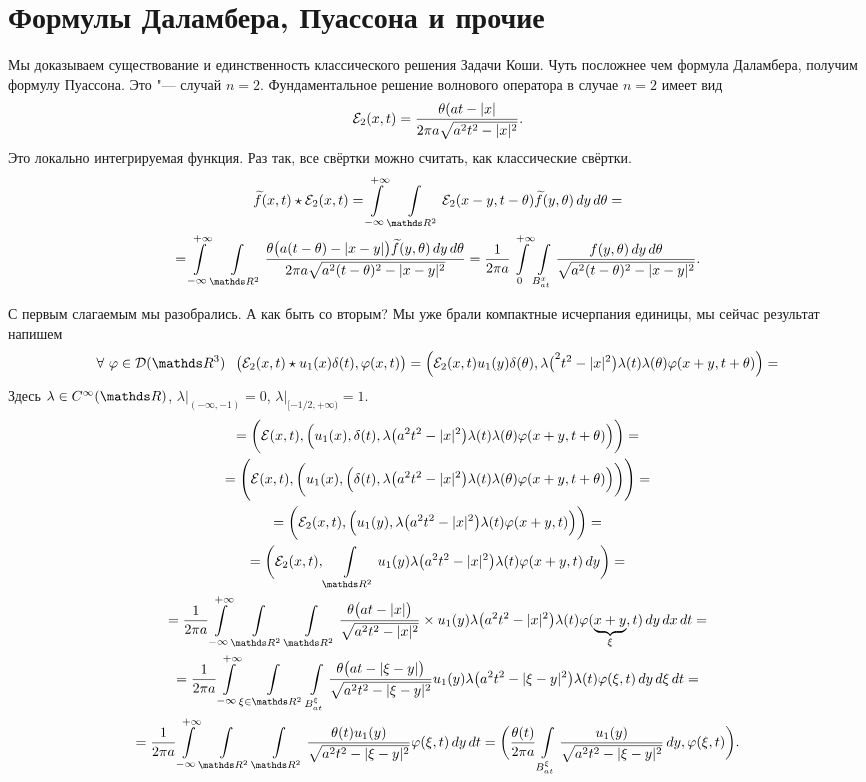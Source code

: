 \section{Формулы Даламбера, Пуассона и прочие}

Мы доказываем существование и единственность классического решения Задачи Коши. Чуть посложнее чем формула Даламбера, получим формулу Пуассона. Это "--- случай $n=2$.
Фундаментальное решение волнового оператора в случае $n=2$ имеет вид
\[
  \mathcal E_2(x,t) = \frac{\theta(at - |x|}{2\pi a\sqrt{a^2t^2-|x|^2}}.
\]
Это локально интегрируемая функция. Раз так, все свёртки можно считать, как классические свёртки.
\begin{multline*}
  \Til f(x,t)\star\E_2(x,t) = \int\limits_{-\infty}^{+\infty} \Gint{\R^2} \E_2(x-y,t-\theta) \Til f(y,\theta)\,dy\,d\theta = \\=
  \int\limits_{-\infty}^{+\infty} \Gint{\R^2}\frac{\theta\big(a(t-\theta) -|x-y|\big)\Til f(y,\theta)\,dy\,d\theta }{2\pi a\sqrt{a^2(t-\theta)^2 - |x-y|^2}} = 
  \frac1{2\pi a}\int\limits_0^{+\infty}\Gint{B_{at}^x} \frac{f(y,\theta)\,dy\,d\theta}{\sqrt{a^2(t-\theta)^2 - |x-y|^2}}.
\end{multline*}

С первым слагаемым мы разобрались. А как быть со вторым? Мы уже брали компактные исчерпания единицы, мы сейчас результат напишем
\[
  \forall\ \phi\in \D(\R^3)\pau 
  \big(\E_2(x,t)\star u_1(x)\delta(t),\phi(x,t)\big) =
  \Big(\E_2(x,t) u_1(y)\delta(\theta),
    \lambda \big(^2t^2 - |x|^2\big)\lambda(t)\lambda(\theta)\phi(x+y,t+\theta)\Big) = 
\]
Здесь $\lambda\in C^{\infty}(\R)$, $\lambda|_{(-\infty,-1)}=0$, $\lambda|_{[-1/2,+\infty)}=1$.
\begin{multline*}
= \bigg(\E(x,t),\Big(u_1(x),\delta(t),\lambda\big(a^2t^2-|x|^2\big)\lambda(t)\lambda(\theta)\phi(x+y,t+\theta)\Big)\bigg) =\\
= \Bigg(\E(x,t),\bigg(u_1(x),\Big(\delta(t),\lambda\big(a^2t^2-|x|^2\big)\lambda(t)\lambda(\theta)\phi(x+y,t+\theta)\Big)\bigg)\Bigg) =\\
= \bigg(\E_2(x,t),\Big(u_1(y),\lambda\big(a^2t^2 - |x|^2\big)\lambda(t)\phi(x+y,t)\Big)\bigg) = \\
= \bigg(\E_2(x,t),\Gint{\R^2} u_1(y)\lambda\big(a^2t^2 - |x|^2\big)\lambda(t)\phi(x+y,t)\,dy\bigg) = \\
= \frac1{2\pi a}\int\limits_{-\infty}^{+\infty}\Gint{\R^2}\Gint{\R^2}
  \frac{\theta\big(at - |x|\big)}{\sqrt{a^2t^2-|x|^2}}\times
    u_1(y)\lambda\big(a^2t^2 - |x|^2\big)\lambda(t)\phi(\underbrace{x+y}_{\xi},t)\,dy\,dx\,dt=\\
= \frac1{2\pi a}\int\limits_{-\infty}^{+\infty}\Gint{\xi\in\R^2}\Gint{B^\xi_{at}}
  \frac{\theta\big(at - |\xi-y|\big)}{\sqrt{a^2t^2 - |\xi-y|^2}}u_1(y)\lambda\big(a^2t^2 - |\xi-y|^2\big)\lambda(t)\phi(\xi,t)\,dy\,d\xi\,dt=\\
= \frac1{2\pi a}\int\limits_{-\infty}^{+\infty}\Gint{\R^2}\Gint{\R^2}
  \frac{\theta(t)u_1(y)}{\sqrt{a^2t^2 - |\xi-y|^2}}\phi(\xi,t)\,dy\,dt=
  \bigg(\frac{\theta(t)}{2\pi a}\Gint{B^\xi_{at}}
	\frac{u_1(y)}{\sqrt{a^2t^2 - |\xi-y|^2}}\,dy,\phi(\xi,t)\bigg).
\end{multline*}

